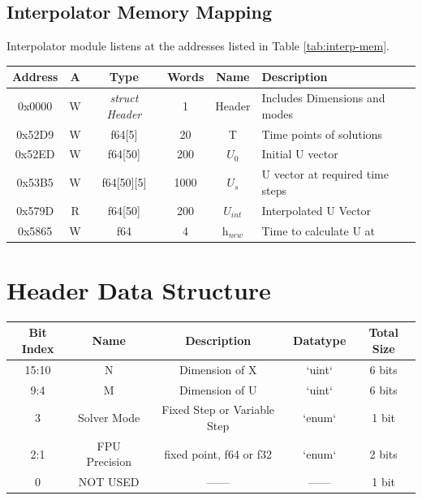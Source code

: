 \documentclass[12pt]{report}
\begin{document}
\subsection{Interpolator Memory Mapping}
Interpolator module listens at the addresses listed in Table \ref{tab:interp-mem}.

\begin{center}
 \begin{tabular}{||c |c| c| c| c| l||} 
 \hline
 Address & A & Type & Words & Name & Description  \\ [0.5ex] 
 \hline\hline
  0x0000 & W & \emph{struct Header} & 1 & Header & Includes Dimensions and modes  \\ 
 \hline
 0x52D9  & W & f64[5] & 20 & T & Time points of solutions  \\
 \hline
 0x52ED  & W & f64[50] & 200 & $U_0$ & Initial U vector \\
 \hline
 0x53B5  & W & f64[50][5] & 1000 & $U_s$ & U vector at required time steps \\
 \hline
 0x579D  & R & f64[50] & 200 & $U_{int}$ & Interpolated U Vector \\
 \hline
 0x5865  & W & f64 & 4 & h$_{new}$ & Time to calculate U at \\ [1ex]
 \hline
\end{tabular}
\end{center}

\section{Header Data Structure}

\begin{center}
 \begin{tabular}{||c c c c c||} 
 \hline
 Bit Index & Name & Description & Datatype & Total Size \\ [0.5ex] 
 \hline\hline
  15:10 & N & Dimension of X  & `uint` & 6 bits  \\ 
 \hline
 9:4 & M & Dimension of U  & `uint` & 6 bits  \\ 
 \hline
 3 & Solver Mode & Fixed Step or Variable Step  & `enum` & 1 bit \\ 
 \hline
 2:1 & FPU Precision & fixed point, f64 or f32 & `enum` & 2 bits  \\ 
 \hline
 0  & NOT USED &  ------ & ------ & 1 bit \\ [1ex] 
 \hline
\end{tabular}
\end{center}
\end{document}
